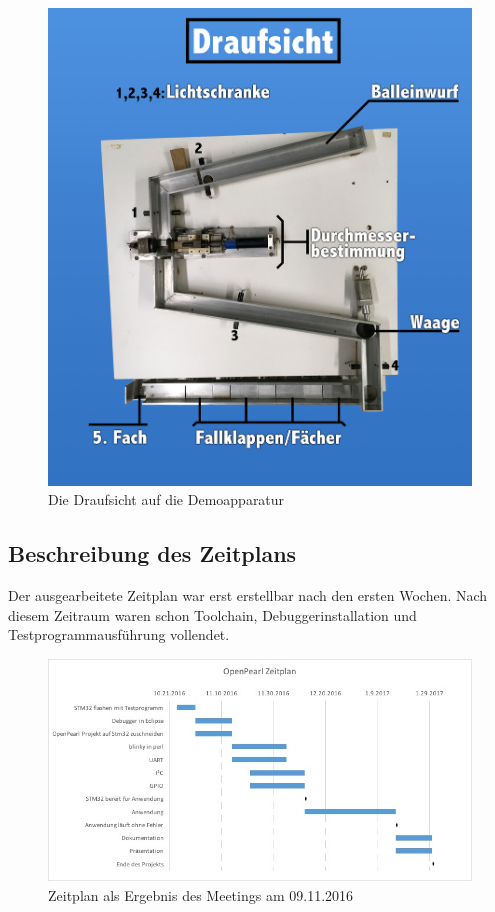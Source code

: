 \begin{figure}[h]
\begin{center}
\includegraphics[width=12cm]{grafiken/Draufsicht.jpg}
\caption{Die Draufsicht auf die Demoapparatur}
\label{draufsicht_sortiermaschine}
\end{center}
\end{figure}

\subsection{Beschreibung des Zeitplans}
Der ausgearbeitete Zeitplan war erst erstellbar nach den ersten Wochen. Nach diesem Zeitraum waren schon Toolchain, Debuggerinstallation und Testprogrammausführung vollendet. 
\begin{figure}[h]
\begin{center}
\includegraphics[width=13.5cm]{grafiken/zeitplan.jpg}
\caption{Zeitplan als Ergebnis des Meetings am 09.11.2016}
\label{zeitplan}
\end{center}
\end{figure}

